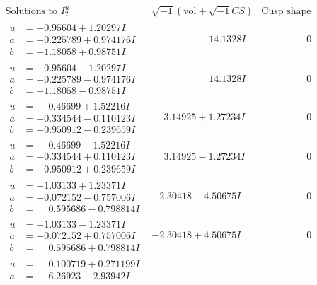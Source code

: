 \documentclass[1p]{elsarticle_modified}
\theoremstyle{definition}
\newcommand{\I}{\sqrt{-1}}
\begin{document}
$$\begin{array}{c|c|c}
\text{Solutions to }I^u_{2}& \I (\text{vol} + \sqrt{-1}CS) & \text{Cusp shape}\\
 \hline 
\begin{aligned}
u &= -0.95604 + 1.20297 I \\
a &= -0.225789 + 0.974176 I \\
b &= -1.18058 + 0.98751 I\end{aligned}
 & \phantom{-0.000000 } -14.1328 I & \phantom{-0.000000 } 0 \\ \hline\begin{aligned}
u &= -0.95604 - 1.20297 I \\
a &= -0.225789 - 0.974176 I \\
b &= -1.18058 - 0.98751 I\end{aligned}
 & \phantom{-0.000000 -}14.1328 I & \phantom{-0.000000 } 0 \\ \hline\begin{aligned}
u &= \phantom{-}0.46699 + 1.52216 I \\
a &= -0.334544 - 0.110123 I \\
b &= -0.950912 - 0.239659 I\end{aligned}
 & \phantom{-}3.14925 + 1.27234 I & \phantom{-0.000000 } 0 \\ \hline\begin{aligned}
u &= \phantom{-}0.46699 - 1.52216 I \\
a &= -0.334544 + 0.110123 I \\
b &= -0.950912 + 0.239659 I\end{aligned}
 & \phantom{-}3.14925 - 1.27234 I & \phantom{-0.000000 } 0 \\ \hline\begin{aligned}
u &= -1.03133 + 1.23371 I \\
a &= -0.072152 - 0.757006 I \\
b &= \phantom{-}0.595686 - 0.798814 I\end{aligned}
 & -2.30418 - 4.50675 I & \phantom{-0.000000 } 0 \\ \hline\begin{aligned}
u &= -1.03133 - 1.23371 I \\
a &= -0.072152 + 0.757006 I \\
b &= \phantom{-}0.595686 + 0.798814 I\end{aligned}
 & -2.30418 + 4.50675 I & \phantom{-0.000000 } 0 \\ \hline\begin{aligned}
u &= \phantom{-}0.100719 + 0.271199 I \\
a &= \phantom{-}6.26923 - 2.93942 I \\

\end{aligned}
\end{array}$$
\end{document}
